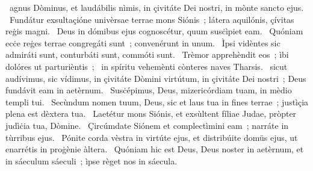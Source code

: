 \psalmChapterWithInscription{}
{ }
{%
~agnus Dòminus, et laudábilis nìmis, in çivitáte Dei nostri, in mònte sancto ejus. 
~Fundátur exsultaçióne univèrsae terrae mons Siónis~; látera aquilónis, çívitas reġis magni. 
~Deus in dómibus ejus cognoscétur, quum susċìpiet eam. 
~Quóniam ecċe reġes terrae congregáti sunt~; convenérunt in unum. 
~Ìpsi vidèntes sic admiráti sunt, conturbáti sunt, commóti sunt. 
~Trèmor apprehèndit eos~; ìbi dolóres ut parturièntis~; 
~in spíritu vehemènti cònteres naves Tharsis. 
~sicut audívimus, sic vídimus, in çivitáte Dòmini virtútum, in çivitáte Dei nostri~; Deus fundávit eam in aetèrnum. 
~Susċépimus, Deus, mizericórdiam tuam, in mèdio templi tui. 
~Secùndum nomen tuum, Deus, sic et laus tua in fines terrae~; justìçia plena est dèxtera tua. 
~Laetétur mons Siónis, et exsùltent fíliae Judae, pròpter judìċia tua, Dòmine. 
~Çircúmdate Siónem et complectìmini eam~; narráte in tùrribus ejus. 
~Pónite corda vèstra in virtúte ejus, et distribúite domüs ejus, ut enarrétis in proġènie àltera. 
~Quóniam hic est Deus, Deus noster in aetèrnum, et in sáeculum sáeculi~; ìpse règet nos in sáecula. 
}
